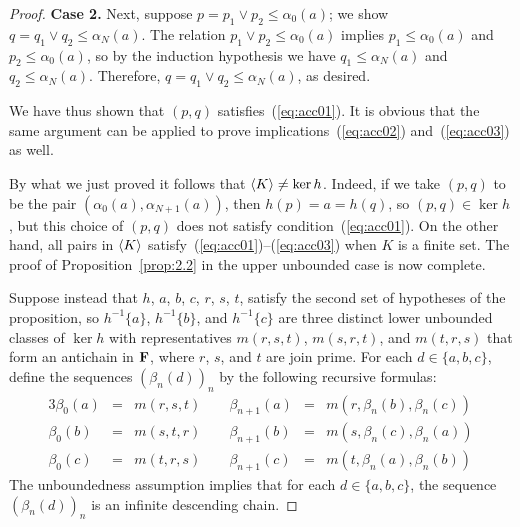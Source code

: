 \begin{proof}
    \medskip
    \noindent \textbf{Case 2.}
    Next, suppose $p = p_1\vee p_2 \leq \alpha_0(a)$; we show 
    $q = q_1 \vee q_2 \leq \alpha_N(a)$. 
    The relation $p_1\vee p_2 \leq \alpha_0(a)$ implies 
    $p_1\leq \alpha_0(a)$ and $p_2\leq \alpha_0(a)$, 
    so by the induction hypothesis we have 
    $q_1\leq \alpha_N(a)$ and $q_2\leq \alpha_N(a)$.  
    Therefore, $q = q_1 \vee q_2 \leq \alpha_N(a)$, as desired.

    We have thus shown that $(p,q)$ satisfies~(\ref{eq:acc01}).
    It is obvious that the same argument can be applied to prove 
    implications~(\ref{eq:acc02}) and~(\ref{eq:acc03}) as well.
  
    \medskip

    By what we just proved it follows that
  $\langle K\rangle \neq \ker h$. Indeed, if we take $(p, q)$ to be 
  the pair $(\alpha_0(a), \alpha_{N+1}(a))$, then  $h(p) = a = h(q)$, 
  so $(p,q) \in \ker h$, but this choice of $(p,q)$ does not satisfy 
  condition~(\ref{eq:acc01}). On 
  the other hand, all pairs in $\langle K\rangle$ 
  satisfy~(\ref{eq:acc01})--(\ref{eq:acc03}) 
  when $K$ is a finite set.   The proof of Proposition~\ref{prop:2.2} 
  in the upper unbounded case is now complete.
  
  \bigskip
Suppose instead that $h$, $a$, $b$, $c$, $r$, $s$, $t$, satisfy the second 
set of hypotheses of the proposition, so $h^{-1}\{a\}$, $h^{-1}\{b\}$, 
and $h^{-1}\{c\}$ are three distinct 
lower unbounded classes of $\ker h$ with representatives $m(r,s,t)$, $m(s,r,t)$, and 
$m(t,r,s)$ that form an antichain in $\mathbf{F}$, where $r$, $s$, and $t$ are join 
prime.
For each $d\in \{a, b, c\}$, define the sequences $(\beta_n(d))_n$
by the following recursive formulas:
\begin{alignat*}{3}
  \beta_0(a)     &= & m(r,s,t)  \qquad 
  \beta_{n+1}(a) &= & m(r,\beta_n(b),\beta_n(c))\\
  \beta_0(b)     &= & m(s,t,r) \qquad  
  \beta_{n+1}(b) &= & m(s,\beta_n(c), \beta_n(a))\\
  \beta_0(c)     &= & m(t,r,s) \qquad   
  \beta_{n+1}(c) &= & m(t,\beta_n(a),\beta_n(b))
\end{alignat*}
The unboundedness assumption implies that for each 
$d \in \{a,b,c\}$, the sequence $(\beta_n(d))_n$ is
an infinite descending chain.


\end{proof}
